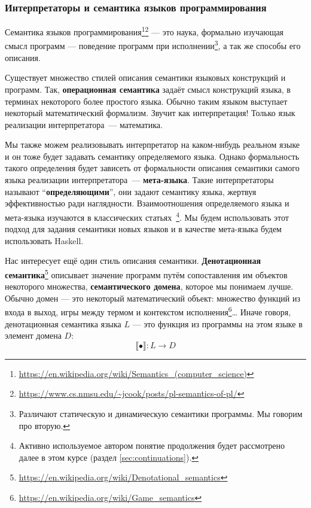 \documentclass[12pt]{article}
\newcommand{\vocab}[1]{\textbf{#1}} %
\newcommand{\sembr}[1]{\llbracket{#1}\rrbracket} %
\begin{document}
    \subsubsection{Интерпретаторы и семантика языков программирования}

    Семантика языков программирования\footnote{\url{https://en.wikipedia.org/wiki/Semantics_(computer_science)}\label{note:sema-wiki}}\footnote{\url{https://www.cs.nmsu.edu/~jcook/posts/pl-semantics-of-pl/}\label{note:sema-cook}} --- это наука, формально изучающая смысл программ --- поведение программ при исполнении\footnote{Различают статическую и динамическую семантики программы. Мы говорим про вторую.}, а так же способы его описания.

    Существует множество стилей описания семантики языковых конструкций и программ.
    Так, \vocab{операционная семантика} задаёт смысл конструкций языка, в терминах некоторого более простого языка.
    Обычно таким языком выступает некоторый математический формализм.
    Звучит как интерпретация!
    Только язык реализации интерпретатора~--- математика.

    Мы также можем реализовывать интерпретатор на каком-нибудь реальном языке и он тоже будет задавать семантику определяемого языка.
    Однако формальность такого определения будет зависеть от формальности описания семантики самого языка реализации интерпретатора~--- \vocab{мета-языка}.
    Такие интерпретаторы называют ``\vocab{определяющими}'', они задают семантику языка, жертвуя эффективностью ради наглядности.
    Взаимоотношения определяемого языка и мета-языка изучаются в классических статьях~\cite{reynolds1972definitional,reynolds1998definitional}\footnote{Активно используемое автором понятие продолжения будет рассмотрено далее в этом курсе (раздел \ref{sec:continuations}).}.
    Мы будем использовать этот подход для задания семантики новых языков и в качестве мета-языка будем использовать Haskell.

    Нас интересует ещё один стиль описания семантики.
    \vocab{Денотационная семантика}\footnote{\url{https://en.wikipedia.org/wiki/Denotational_semantics}} описывает значение программ путём сопоставления им объектов некоторого множества, \vocab{семантического домена}, которое мы понимаем лучше.
    Обычно домен --- это некоторый математический объект: множество функций из входа в выход, игры между термом и контекстом исполнения\footnote{\url{https://en.wikipedia.org/wiki/Game_semantics}}\ldots
    Иначе говоря, денотационная семантика языка $L$ --- это функция из программы на этом языке в элемент домена $D$:
    \[
        \sembr{\bullet} : L \to D
    \]
\end{document}
